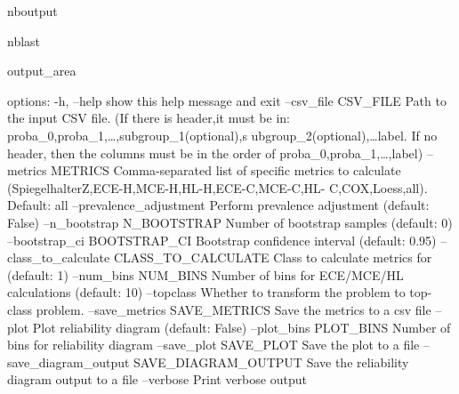 \documentclass[letterpaper,10pt,english]{sphinxmanual}
\begin{document}
\begin{sphinxuseclass}{nboutput}
\begin{sphinxuseclass}{nblast}
{\begin{sphinxuseclass}{output_area}
\begin{sphinxuseclass}{}
\begin{sphinxVerbatim}[commandchars=\\\{\}]
options:
  -h, --help            show this help message and exit
  --csv\_file CSV\_FILE   Path to the input CSV file. (If there is header,it
                        must be in: proba\_0,proba\_1,{\ldots},subgroup\_1(optional),s
                        ubgroup\_2(optional),{\ldots}label. If no header, then the
                        columns must be in the order of
                        proba\_0,proba\_1,{\ldots},label)
  --metrics METRICS     Comma-separated list of specific metrics to calculate
                        (SpiegelhalterZ,ECE-H,MCE-H,HL-H,ECE-C,MCE-C,HL-
                        C,COX,Loess,all). Default: all
  --prevalence\_adjustment
                        Perform prevalence adjustment (default: False)
  --n\_bootstrap N\_BOOTSTRAP
                        Number of bootstrap samples (default: 0)
  --bootstrap\_ci BOOTSTRAP\_CI
                        Bootstrap confidence interval (default: 0.95)
  --class\_to\_calculate CLASS\_TO\_CALCULATE
                        Class to calculate metrics for (default: 1)
  --num\_bins NUM\_BINS   Number of bins for ECE/MCE/HL calculations (default:
                        10)
  --topclass            Whether to transform the problem to top-class problem.
  --save\_metrics SAVE\_METRICS
                        Save the metrics to a csv file
  --plot                Plot reliability diagram (default: False)
  --plot\_bins PLOT\_BINS
                        Number of bins for reliability diagram
  --save\_plot SAVE\_PLOT
                        Save the plot to a file
  --save\_diagram\_output SAVE\_DIAGRAM\_OUTPUT
                        Save the reliability diagram output to a file
  --verbose             Print verbose output
\end{sphinxVerbatim}



\end{sphinxuseclass}
\end{sphinxuseclass}
}

\end{sphinxuseclass}
\end{sphinxuseclass}
\end{document}
